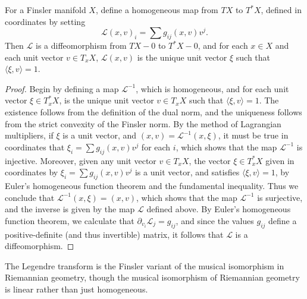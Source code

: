 \begin{lemma}
  For a Finsler manifold $X$, define a homogeneous map from $TX$ to $T^*X$, defined in coordinates by setting
  \[ \mathcal{L}(x,v)_i = \sum g_{ij}(x,v) v^j. \]
  Then $\mathcal{L}$ is a diffeomorphism from $TX - 0$ to $T^*X - 0$, and for each $x \in X$ and each unit vector $v \in T_x X$, $\mathcal{L}(x,v)$ is the unique unit vector $\xi$ such that $\langle \xi, v \rangle = 1$.
\end{lemma}
\begin{proof}
  Begin by defining a map $\mathcal{L}^{-1}$, which is homogeneous, and for each unit vector $\xi \in T_x^* X$, is the unique unit vector $v \in T_x X$ such that $\langle \xi, v \rangle = 1$. The existence follows from the definition of the dual norm, and the uniqueness follows from the strict convexity of the Finsler norm. By the method of Lagrangian multipliers, if $\xi$ is a unit vector, and $(x,v) = \mathcal{L}^{-1}(x,\xi)$, it must be true in coordinates that $\xi_i = \sum g_{ij}(x,v) v^j$ for each $i$, which shows that the map $\mathcal{L}^{-1}$ is injective. Moreover, given any unit vector $v \in T_x X$, the vector $\xi \in T_x^* X$ given in coordinates by $\xi_i = \sum g_{ij}(x,v) v^j$ is a unit vector, and satisfies $\langle \xi, v \rangle = 1$, by Euler's homogeneous function theorem and the fundamental inequality. Thus we conclude that $\mathcal{L}^{-1}(x,\xi) = (x,v)$, which shows that the map $\mathcal{L}^{-1}$ is surjective, and the inverse is given by the map $\mathcal{L}$ defined above. By Euler's homogeneous function theorem, we calculate that $\partial_{v_i} \mathcal{L}_j = g_{ij}$, and since the values $g_{ij}$ define a positive-definite (and thus invertible) matrix, it follows that $\mathcal{L}$ is a diffeomorphism.
\end{proof}

The Legendre transform is the Finsler variant of the musical isomorphism in Riemannian geometry, though the musical isomorphism of Riemannian geometry is linear rather than just homogeneous.

